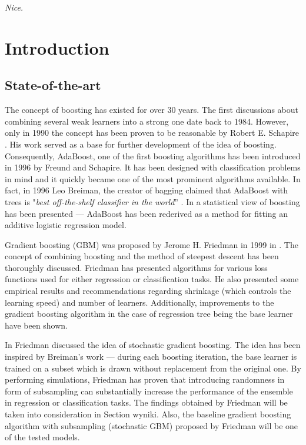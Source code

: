 \documentclass[magisterska, english]{pwr_wmat_praca_dyplomowa}
\theoremstyle{plain}
\numberwithin{theorem}{chapter}
\theoremstyle{definition}
\numberwithin{theorem}{chapter}
\begin{document}
\frontmatter
\maketitle
\mainmatter
\thispagestyle{empty}
\begin{flushright}
  \null\vfill
  \Large
  \textit{
  Nice.}\\
  \vspace{-1cm}
\end{flushright}

\tableofcontents

\chapter{Introduction}
\section{State-of-the-art}
The concept of boosting has existed for over 30 years. The first discussions about combining several weak learners into a strong one date back to 1984. However, only in 1990 the concept has been proven to be reasonable by Robert E. Schapire \cite{schapire1990}. His work served as a base for further development of the idea of boosting. Consequently, AdaBoost, one of the first boosting algorithms has been introduced in 1996 by Freund and Schapire. It has been designed with classification problems in mind and it quickly became one of the most prominent algorithms available. In fact, in 1996 Leo Breiman, the creator of bagging claimed that AdaBoost with trees is "\emph{best off-the-shelf classifier in the world}” \cite{esl}. In \cite{add_log} a statistical view of boosting has been presented --- AdaBoost has been rederived as a method for
fitting an additive logistic regression model.

Gradient boosting (GBM) was proposed by Jerome H. Friedman in 1999 in \cite{friedman_gbm}. The concept of combining boosting and the method of steepest descent has been thoroughly discussed. Friedman has presented algorithms for various loss functions used for either regression or classification tasks. He also presented some empirical results and recommendations regarding shrinkage (which controls the learning speed) and number of learners. Additionally, improvements to the gradient boosting algorithm in the case of regression tree being the base learner have been shown. 

In \cite{friedman_stoch} Friedman discussed the idea of stochastic gradient boosting. The idea has been inspired by Breiman's work --- during each boosting iteration, the base learner is trained on a subset which is drawn without replacement from the original one. By performing simulations, Friedman has proven that introducing randomness in form of subsampling can substantially increase the performance of the ensemble in regression or classification tasks. The findings obtained by Friedman will be taken into consideration in Section {wyniki}. %
Also, the baseline gradient boosting algorithm with subsampling (stochastic GBM) proposed by Friedman will be one of the tested models.
\end{document}
